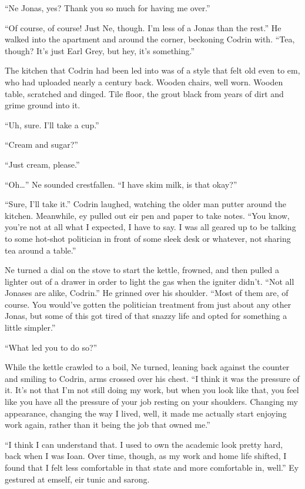 ``Ne Jonas, yes? Thank you so much for having me over.''

``Of course, of course! Just Ne, though. I'm less of a Jonas than the rest.'' He walked into the apartment and around the corner, beckoning Codrin with. ``Tea, though? It's just Earl Grey, but hey, it's something.''

The kitchen that Codrin had been led into was of a style that felt old even to em, who had uploaded nearly a century back. Wooden chairs, well worn. Wooden table, scratched and dinged. Tile floor, the grout black from years of dirt and grime ground into it.

``Uh, sure. I'll take a cup.''

``Cream and sugar?''

``Just cream, please.''

``Oh\ldots{}'' Ne sounded crestfallen. ``I have skim milk, is that okay?''

``Sure, I'll take it.'' Codrin laughed, watching the older man putter around the kitchen. Meanwhile, ey pulled out eir pen and paper to take notes. ``You know, you're not at all what I expected, I have to say. I was all geared up to be talking to some hot-shot politician in front of some sleek desk or whatever, not sharing tea around a table.''

Ne turned a dial on the stove to start the kettle, frowned, and then pulled a lighter out of a drawer in order to light the gas when the igniter didn't. ``Not all Jonases are alike, Codrin.'' He grinned over his shoulder. ``Most of them are, of course. You would've gotten the politician treatment from just about any other Jonas, but some of this got tired of that snazzy life and opted for something a little simpler.''

``What led you to do so?''

While the kettle crawled to a boil, Ne turned, leaning back against the counter and smiling to Codrin, arms crossed over his chest. ``I think it was the pressure of it. It's not that I'm not still doing my work, but when you look like that, you feel like you have all the pressure of your job resting on your shoulders. Changing my appearance, changing the way I lived, well, it made me actually start enjoying work again, rather than it being the job that owned me.''

``I think I can understand that. I used to own the academic look pretty hard, back when I was Ioan. Over time, though, as my work and home life shifted, I found that I felt less comfortable in that state and more comfortable in, well.'' Ey gestured at emself, eir tunic and sarong.

